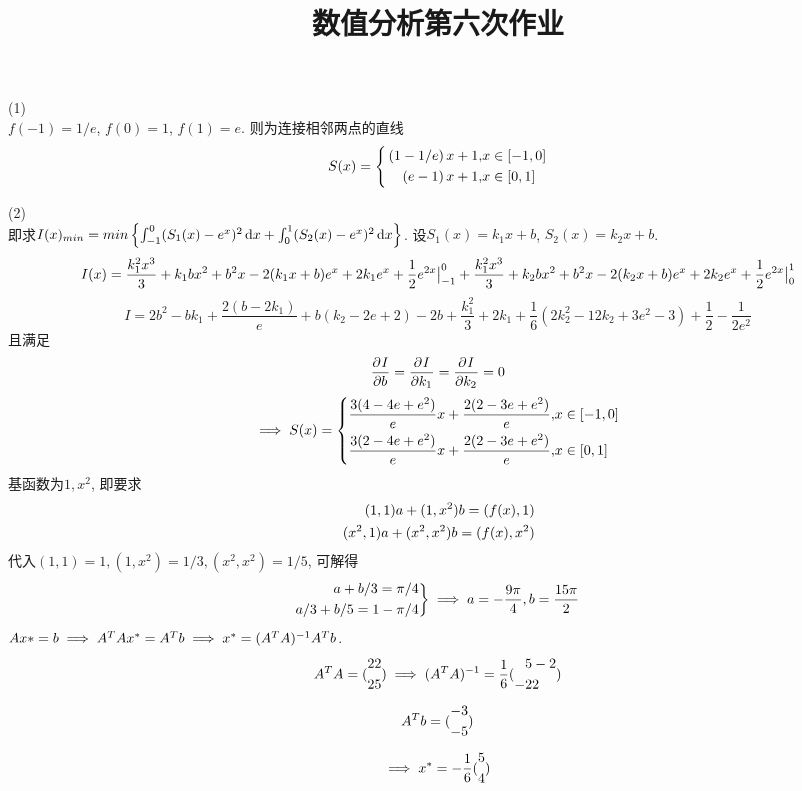 \documentclass[UTF8,9pt]{ctexart}
\title{数值分析第六次作业}
\begin{document}
 
\maketitle
{}
(1) \\
$f(-1)=1/e$, $f(0)=1$, $f(1)=e$. 
则为连接相邻两点的直线
$$S(x)=\left\{\begin{aligned} 
        \,(1-1/e)\, x+1, &x\in[-1,0]\\
        \,(e-1)\, x+1, &x\in[0,1]
 \end{aligned}\right.$$

(2)\\
即求$I(x)_{min}=min\left\{ \int_{-1}^0(S_1(x)-e^x)^2\mathop{}\!\mathrm{d} x+\int_{0}^1(S_2(x)-e^x)^2\mathop{}\!\mathrm{d} x \right\}$. 设$S_1(x)=k_1x+b$, $S_2(x)=k_2x+b$. 
$$I(x)=\frac{k_1^2x^3}{3}+k_1bx^2+b^2x-2(k_1x+b)e^x+2k_1e^x+\frac{1}{2}e^{2x}\big|_{-1}^0+\frac{k_1^2x^3}{3}+k_2bx^2+b^2x-2(k_2x+b)e^x+2k_2e^x+\frac{1}{2}e^{2x}\big|_{0}^1$$
$$I=2 b^2-b k_1+\frac{2 (b-2 k_1)}{e}+b (k_2-2 e+2)-2 b+\frac{k_1^2}{3}+2 k_1+\frac{1}{6} (2 k_2^2-12 k_2+3 e^2-3)+\frac{1}{2}-\frac{1}{2 e^2}$$
且满足
$$\frac{\partial^{} I}{\partial {b}^{}}=\frac{\partial^{} I}{\partial {k_1}^{}}=\frac{\partial^{} I}{\partial {k_2}^{}}=0$$
$$\implies S(x)=\left\{\begin{aligned} 
        \frac{3 (4-4 e+e^2)}{e} x+\frac{2 (2-3 e+e^2)}{e}, &x\in[-1,0]\\
        \-\frac{3 (2-4 e+e^2)}{e} x+\frac{2 (2-3 e+e^2)}{e}, &x\in[0,1]
 \end{aligned}\right.$$
基函数为$1,x^2$,
即要求$$\begin{aligned} 
        \,(1,1)a+(1,x^2)b=(f(x),1)\\
        \,(x^2,1)a+(x^2,x^2)b=(f(x),x^2)
 \end{aligned}$$
代入$(1,1)=1,(1,x^2)=1/3,(x^2,x^2)=1/5$, 可解得
$$\begin{aligned} 
        a+b/3=\pi/4\\
        a/3+b/5 = 1-\pi/4
 \end{aligned}\bigg\}\implies a=-\frac{9\pi}{4},b=\frac{15\pi}{2}$$
$Ax*=b \implies A^TAx^*=A^Tb \implies x^*=(A^TA)^{-1}A^Tb$.
$$A^TA=(\begin{aligned} 2&2\\2&5 \end{aligned})\implies (A^TA)^{-1} = \frac{1}{6}(\begin{aligned} 5&-2\\-2&2 \end{aligned})$$
$$A^Tb=(\begin{aligned} -3\\-5 \end{aligned})$$
$$\implies x^* = -\frac{1}{6}(\begin{aligned} 5\\4 \end{aligned})$$
\end{document}
